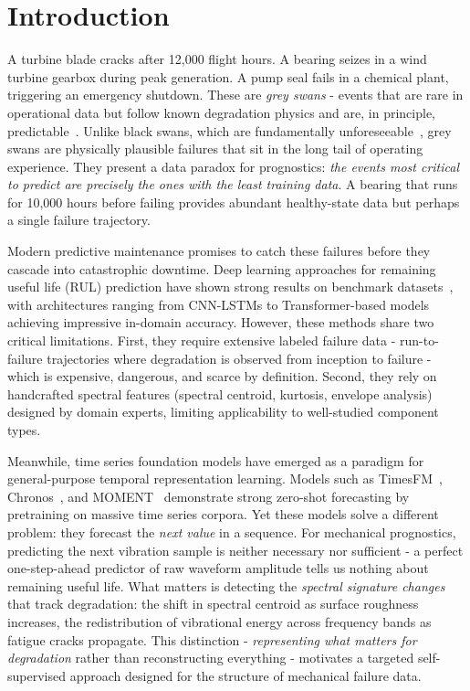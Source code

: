 \section{Introduction}
\label{sec:intro}

A turbine blade cracks after 12,000 flight hours. A bearing seizes in a wind turbine gearbox during peak generation. A pump seal fails in a chemical plant, triggering an emergency shutdown. These are \emph{grey swans} - events that are rare in operational data but follow known degradation physics and are, in principle, predictable~\citep{greyswan_supplychain2025}. Unlike black swans, which are fundamentally unforeseeable~\citep{taleb2007blackswan}, grey swans are physically plausible failures that sit in the long tail of operating experience. They present a data paradox for prognostics: \emph{the events most critical to predict are precisely the ones with the least training data}. A bearing that runs for 10,000 hours before failing provides abundant healthy-state data but perhaps a single failure trajectory.

Modern predictive maintenance promises to catch these failures before they cascade into catastrophic downtime. Deep learning approaches for remaining useful life (RUL) prediction have shown strong results on benchmark datasets~\citep{lei2018machinery, zhao2019deeplearningphm}, with architectures ranging from CNN-LSTMs to Transformer-based models achieving impressive in-domain accuracy. However, these methods share two critical limitations. First, they require extensive labeled failure data - run-to-failure trajectories where degradation is observed from inception to failure - which is expensive, dangerous, and scarce by definition. Second, they rely on handcrafted spectral features (spectral centroid, kurtosis, envelope analysis) designed by domain experts, limiting applicability to well-studied component types.

Meanwhile, time series foundation models have emerged as a paradigm for general-purpose temporal representation learning. Models such as TimesFM~\citep{das2024timesfm}, Chronos~\citep{ansari2024chronos}, and MOMENT~\citep{goswami2024moment} demonstrate strong zero-shot forecasting by pretraining on massive time series corpora. Yet these models solve a different problem: they forecast the \emph{next value} in a sequence. For mechanical prognostics, predicting the next vibration sample is neither necessary nor sufficient - a perfect one-step-ahead predictor of raw waveform amplitude tells us nothing about remaining useful life. What matters is detecting the \emph{spectral signature changes} that track degradation: the shift in spectral centroid as surface roughness increases, the redistribution of vibrational energy across frequency bands as fatigue cracks propagate. This distinction - \emph{representing what matters for degradation} rather than reconstructing everything - motivates a targeted self-supervised approach designed for the structure of mechanical failure data.

